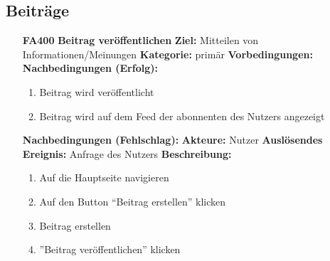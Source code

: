 \documentclass[parskip=full]{scrartcl}
\begin{document}
		\subsection{Beiträge} \label{sec:FABeiträge}
		\begin{itemize}[nosep]
			\item[\textbf{FA400}]\textbf{Beitrag veröffentlichen}
			\newline \textbf{Ziel:} Mitteilen von Informationen/Meinungen
			\newline \textbf{Kategorie:} primär
			\newline \textbf{Vorbedingungen:}
			\newline \textbf{Nachbedingungen (Erfolg):}
			\begin{enumerate}[nosep]
				\item Beitrag wird  veröffentlicht
				\item Beitrag wird auf dem \gls{Feed} der abonnenten des Nutzers angezeigt
			\end{enumerate}
			\textbf{Nachbedingungen (Fehlschlag):}
			\newline \textbf{Akteure:} Nutzer
			\newline \textbf{Auslösendes Ereignis:} Anfrage des Nutzers
			\newline \textbf{Beschreibung:}
			\begin{enumerate}[nosep]
				\item Auf die Hauptseite navigieren
				\item Auf den Button “Beitrag erstellen” klicken
				\item Beitrag erstellen
				\item ”Beitrag veröffentlichen” klicken\\
			\end{enumerate}
			

\end{itemize}
\end{document}
